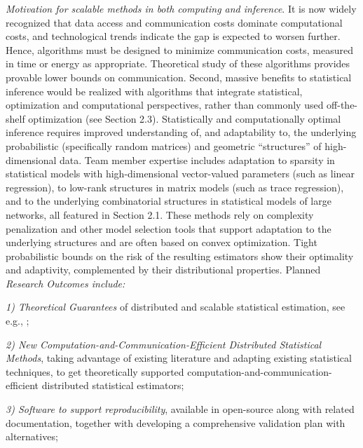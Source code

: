 \documentclass[12pt]{article}
\begin{document}
{\it Motivation for scalable methods in both computing and inference}.
It is now widely recognized that data access and communication costs dominate computational
costs, and technological trends indicate the gap is expected to worsen further.
Hence, algorithms must be designed to minimize communication costs,
measured in time or energy as appropriate. Theoretical study of these algorithms provides
provable lower bounds on communication. Second, massive benefits to statistical inference
would be realized  with algorithms that integrate statistical, optimization and
computational perspectives, rather than commonly used off-the-shelf optimization
(see Section 2.3). Statistically and computationally optimal inference  requires
improved understanding of, and adaptability to, the underlying probabilistic (specifically random matrices) and geometric ``structures'' of high-dimensional data.
Team member expertise includes adaptation to sparsity in statistical models with high-dimensional vector-valued parameters (such as linear regression), to low-rank structures in matrix models (such as trace regression), and to the underlying combinatorial structures in statistical models of large networks, all featured in Section 2.1.
These methods rely on complexity penalization and other model selection tools that support adaptation to the underlying structures and are often based on convex optimization.
Tight probabilistic bounds on the risk of the resulting estimators show their optimality and adaptivity, complemented by their distributional properties.  Planned {\it Research Outcomes include:}

{\em 1) Theoretical Guarantees} of distributed and scalable statistical estimation, see e.g., \cite{HuangHuo2015onestep};

{\em 2) New Computation-and-Communication-Efficient Distributed Statistical Methods},
taking advantage of existing literature and adapting existing statistical techniques,
to get theoretically supported computation-and-communication-efficient distributed statistical estimators;

{\em 3) Software to support reproducibility},  available in open-source along with related documentation, together
with developing  a comprehensive validation plan  with alternatives;
\end{document}
